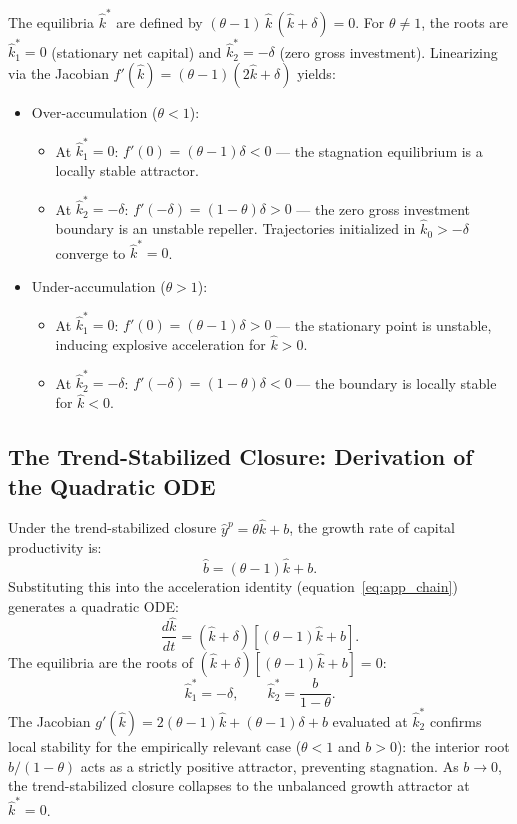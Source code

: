 The equilibria $\hat{k}^*$ are defined by $(\theta - 1)\,\hat{k}\,(\hat{k} + \delta) = 0$. For $\theta \neq 1$, the roots are $\hat{k}_1^* = 0$ (stationary net capital) and $\hat{k}_2^* = -\delta$ (zero gross investment). Linearizing via the Jacobian $f'(\hat{k}) = (\theta - 1)(2\hat{k} + \delta)$ yields:
\begin{itemize}
    \item Over-accumulation ($\theta < 1$):
    \begin{itemize}
        \item At $\hat{k}_1^* = 0$: $f'(0) = (\theta - 1)\delta < 0$ --- the stagnation equilibrium is a locally stable attractor.
        \item At $\hat{k}_2^* = -\delta$: $f'(-\delta) = (1 - \theta)\delta > 0$ --- the zero gross investment boundary is an unstable repeller. Trajectories initialized in $\hat{k}_0 > -\delta$ converge to $\hat{k}^* = 0$.
    \end{itemize}
    \item Under-accumulation ($\theta > 1$):
    \begin{itemize}
        \item At $\hat{k}_1^* = 0$: $f'(0) = (\theta - 1)\delta > 0$ --- the stationary point is unstable, inducing explosive acceleration for $\hat{k} > 0$.
        \item At $\hat{k}_2^* = -\delta$: $f'(-\delta) = (1 - \theta)\delta < 0$ --- the boundary is locally stable for $\hat{k} < 0$.
    \end{itemize}
\end{itemize}

\subsection{The Trend-Stabilized Closure: Derivation of the Quadratic ODE}
\label{app:extended_derivation}

Under the trend-stabilized closure $\hat{y}^p = \theta\hat{k} + b$, the growth rate of capital productivity is:
\begin{equation}\label{eq:app_bhat_extended}
    \hat{b} = (\theta - 1)\hat{k} + b.
\end{equation}
Substituting this into the acceleration identity (equation~\ref{eq:app_chain}) generates a quadratic ODE:
\begin{equation}\label{eq:app_extended_ode}
    \frac{d\hat{k}}{dt} = (\hat{k} + \delta)\left[(\theta - 1)\hat{k} + b\right].
\end{equation}
The equilibria are the roots of $(\hat{k} + \delta)[(\theta - 1)\hat{k} + b] = 0$:
\begin{equation}\label{eq:app_extended_roots}
    \hat{k}_1^* = -\delta, \qquad \hat{k}_2^* = \frac{b}{1 - \theta}.
\end{equation}
The Jacobian $g'(\hat{k}) = 2(\theta - 1)\hat{k} + (\theta-1)\delta + b$ evaluated at $\hat{k}_2^*$ confirms local stability for the empirically relevant case ($\theta < 1$ and $b > 0$): the interior root $b/(1-\theta)$ acts as a strictly positive attractor, preventing stagnation. As $b \to 0$, the trend-stabilized closure collapses to the unbalanced growth attractor at $\hat{k}^* = 0$.
